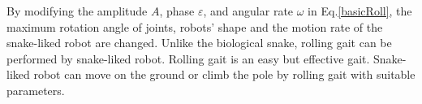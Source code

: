 By modifying the amplitude $A$, phase $\varepsilon$, and angular rate $\omega$ in Eq.\ref{basicRoll}, the maximum rotation angle of joints, robots' shape and the motion rate of the snake-liked robot are changed. Unlike the biological snake, rolling gait can be performed by snake-liked robot. Rolling gait is an easy but effective gait. Snake-liked robot can move on the ground or climb the pole by rolling gait with suitable parameters.
